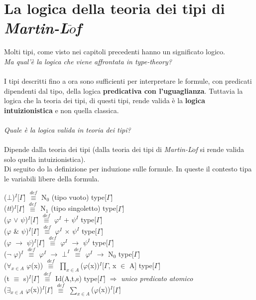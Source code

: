 \chapter{La logica della teoria dei tipi di \textit{Martin-L$\ddot{o}$f}}
Molti tipi, come visto nei capitoli precedenti hanno un significato logico.\\\textit{Ma qual'\`e la logica che viene affrontata in \textit{type-theory}?}\\\\
\noindent I tipi descritti fino a ora sono sufficienti per interpretare le formule, con predicati dipendenti dal tipo, della logica \textbf{predicativa con l'uguaglianza}. Tuttavia la logica che la teoria dei tipi, di questi tipi, rende valida \`e la \textbf{logica intuizionistica} e non quella classica.\\\\
\noindent
\textit{Quale \`e la logica valida in teoria dei tipi?}\\\\
\noindent Dipende dalla teoria dei tipi (dalla teoria dei tipi di \textit{Martin-L$\ddot{o}$f} si rende valida solo quella intuizionistica).\\
Di seguito do la definizione per induzione sulle formule. In queste il contesto tipa le variabili libere della formula.
\begin{center}
($\bot$)$^I$[$\Gamma$] ${\overset{\mathit{def}}{\equiv}}$ N$_0$ (tipo vuoto) type[$\Gamma$]\\
(\textit{tt})$^I$[$\Gamma$] ${\overset{\mathit{def}}{\equiv}}$ N$_1$ (tipo singoletto) type[$\Gamma$]\\
($\varphi$ $\vee$ $\psi$)$^I$[$\Gamma$] ${\overset{\mathit{def}}{\equiv}}$ $\varphi^I$ $+$ $\psi^I$ type[$\Gamma$]\\
($\varphi$ $\&$ $\psi$)$^I$[$\Gamma$] ${\overset{\mathit{def}}{\equiv}}$ $\varphi^I$ $\times$ $\psi^I$ type[$\Gamma$]\\
($\varphi$ $\rightarrow$ $\psi$)$^I$[$\Gamma$] ${\overset{\mathit{def}}{\equiv}}$ $\varphi^I$ $\rightarrow$ $\psi^I$ type[$\Gamma$]\\
($\neg$ $\varphi$)$^I$ ${\overset{\mathit{def}}{\equiv}}$ $\varphi^I$ $\rightarrow$ $\bot^I$ ${\overset{\mathit{def}}{\equiv}}$ $\varphi^I$ $\rightarrow$ N$_0$ type[$\Gamma$]\\
($\forall_{x \in A}$ $\varphi$(x)) ${\overset{\mathit{def}}{\equiv}}$ $\prod\limits_{x \in A}$($\varphi$(x))$^I$[$\Gamma$, x $\in$ A] type[$\Gamma$]\\
(t $\equiv$ s)$^I$[$\Gamma$] ${\overset{\mathit{def}}{\equiv}}$ Id(A,t,s) type[$\Gamma$] $\Rightarrow$ \textit{unico predicato atomico}\\
($\exists_{x \in A}$ $\varphi$(x))$^I$[$\Gamma$] ${\overset{\mathit{def}}{\equiv}}$ $\sum\limits_{x \in A}$($\varphi$(x))$^I$[$\Gamma$]
\end{center}
